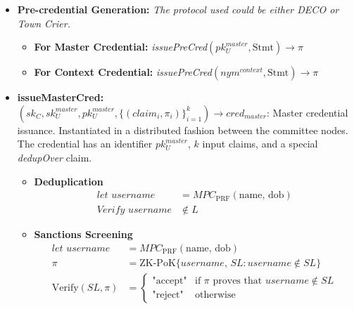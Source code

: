 \begin{itemize}
\item \textbf{Pre-credential Generation:} \textit{The protocol used could be either DECO or Town Crier.}
    \begin{itemize}
    \item \textbf{For Master Credential:} \textit{issuePreCred$(pk_U^{master}, \text{Stmt}) \rightarrow \pi$}
    \item \textbf{For Context Credential:} \textit{issuePreCred$(nym^{context}, \text{Stmt}) \rightarrow \pi$}
    \end{itemize}
\end{itemize}

\begin{itemize}
    \item \textbf{issueMasterCred: \( (sk_C, sk_U^{master}, pk_U^{master}, \{({claim}_i, \pi_i)\}_{i=1}^k) \rightarrow {cred_{master}} \)}: Master credential issuance. Instantiated in a distributed fashion between the committee nodes. The credential has an identifier \( pk_U^{master} \), \( k \) input claims, and a special \textit{dedupOver} claim.
    \begin{itemize}
        \item \textbf{Deduplication}
        \begin{align*}
            \textit{let username} &= \textit{MPC}_{\text{PRF}}(\text{name, dob}) \\
            \textit{Verify username} &\notin L
        \end{align*}
    
        \item \textbf{Sanctions Screening}
        \begin{align*}
            \textit{let username} &= \textit{MPC}_{\text{PRF}}(\text{name, dob}) \\
            \pi &= \text{ZK-PoK} \{username, \, SL: username \notin SL\} \\
            \text{Verify}(SL, \pi) &= 
            \begin{cases}
                \text{"accept"} & \text{if } \pi \text{ proves that } username \notin SL \\
                \text{"reject"} & \text{otherwise}
            \end{cases}
        \end{align*}
    \end{itemize}
    

\end{itemize}
